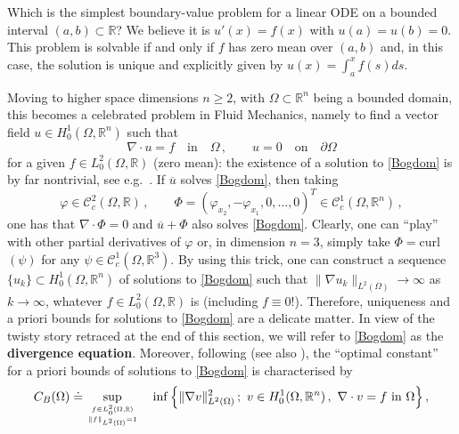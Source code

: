\documentclass[11pt]{article}
\theoremstyle{plain}
\theoremstyle{definition}
\numberwithin{equation}{section}
\newcommand{\R}{\mathbb{R}}
\begin{document}
Which is the simplest boundary-value problem for a linear ODE on a bounded interval $(a,b)\subset\R$? We believe it is
$u'(x)=f(x)$ with $u(a)=u(b)=0$. This problem is solvable if and only if $f$ has zero mean over $(a,b)$ and, in this case,
the solution is unique and explicitly given by $u(x)=\int_{a}^{x}f(s)ds$.\par
Moving to higher space dimensions $n\ge2$, with $\Omega \subset \mathbb{R}^{n}$ being a bounded domain, this becomes a celebrated problem in
Fluid Mechanics, namely to find a vector field $u\in H^1_0(\Omega, \mathbb{R}^{n})$ such that
\begin{equation}\label{Bogdom}
\nabla\cdot u=f \quad \mbox{in} \quad \Omega\, ,\qquad u=0 \quad \mbox{on} \quad \partial\Omega
\end{equation}
for a given $f\in L^2_0(\Omega, \mathbb{R})$ (zero mean): the existence of a solution to \eqref{Bogdom} is by far nontrivial,
see e.g.\ \cite[Theorem III.3.1]{galdi2011introduction}. If $\overline{u}$ solves \eqref{Bogdom}, then taking
\begin{equation}\label{phiPhi}
\varphi\in \mathcal{C}^2_c(\Omega, \mathbb{R})\, ,\qquad \Phi=(\varphi_{x_2}, -\varphi_{x_1},0, \ldots,0)^{T}\in \mathcal{C}^1_c(\Omega, \mathbb{R}^{n})\, ,
\end{equation}
one has that $\nabla\cdot\Phi=0$ and $\overline{u}+\Phi$ also solves \eqref{Bogdom}. Clearly, one can ``play'' with other partial derivatives
of $\varphi$ or, in dimension $n=3$, simply take $\Phi=$curl$(\psi)$ for any $\psi\in \mathcal{C}^1_c(\Omega, \mathbb{R}^{3})$. By using this trick, one can construct a sequence
$\{u_k\}\subset H^1_0(\Omega, \mathbb{R}^{n})$ of solutions to \eqref{Bogdom} such that $\|\nabla u_k\|_{L^2(\Omega)}\to\infty$ as $k\to\infty$, whatever
$f\in L^2_0(\Omega, \mathbb{R})$ is (including $f\equiv0$!). Therefore, uniqueness and a priori bounds for solutions to \eqref{Bogdom} are
a delicate matter. In view of the twisty story retraced at the end of this section, we will refer to \eqref{Bogdom} as the
{\bf divergence equation}. Moreover, following \cite[(2.3)]{costabel} (see also \cite{gazspefra}), the ``optimal constant'' for a priori bounds of solutions to \eqref{Bogdom} is characterised by
\begin{equation}\label{bogo11}
C_B(\Omega) \doteq   \sup_ {f\in L^2_0(\Omega, \mathbb{R}) \atop \|f\|_{L^2(\Omega)}=1}\quad\inf\Big\{\|\nabla v\|_{L^2(\Omega)}^2\, ;\ v\in H^1_0(\Omega, \mathbb{R}^{n})\, ,
\ \nabla\cdot v=f\text{ in }\Omega\Big\}\, ,
\end{equation}
\end{document}
